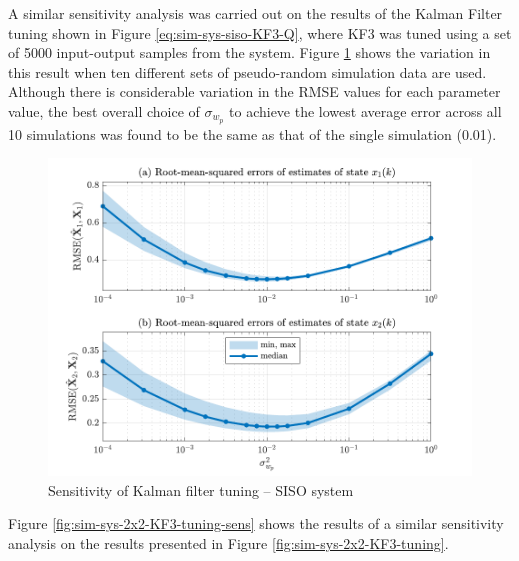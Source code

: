 A similar sensitivity analysis was carried out on the results of the Kalman Filter tuning shown in Figure \ref{eq:sim-sys-siso-KF3-Q}, where KF3 was tuned using a set of 5000 input-output samples from the system. Figure \ref{fig:sim-sys-siso-KF3-sensitivity} shows the variation in this result when ten different sets of pseudo-random simulation data are used.  Although there is considerable variation in the RMSE values for each parameter value, the best overall choice of $\sigma_{w_p}$ to achieve the lowest average error across all 10 simulations was found to be the same as that of the single simulation (0.01).

\begin{figure}[htp]
	\centering
	\includegraphics[width=14cm]{images/rod_obs_sim1_3KF_Q_statplot.pdf}
	\caption{Sensitivity of Kalman filter tuning – SISO system}
	\label{fig:sim-sys-siso-KF3-sensitivity}
\end{figure}

Figure \ref{fig:sim-sys-2x2-KF3-tuning-sens} shows the results of a similar sensitivity analysis on the results presented in Figure \ref{fig:sim-sys-2x2-KF3-tuning}.

